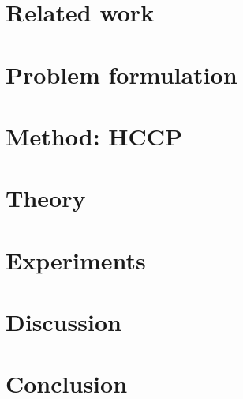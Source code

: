 \documentclass{article}
\begin{document}


\section{Related work}
\label{sec:related}



\section{Problem formulation}
\label{sec:formulation}



\section{Method: HCCP}
\label{sec:method}



\section{Theory}
\label{sec:theory}



\section{Experiments}
\label{sec:experiments}



\section{Discussion}
\label{sec:discussion}



\section{Conclusion}
\label{sec:conclusion}
\end{document}
